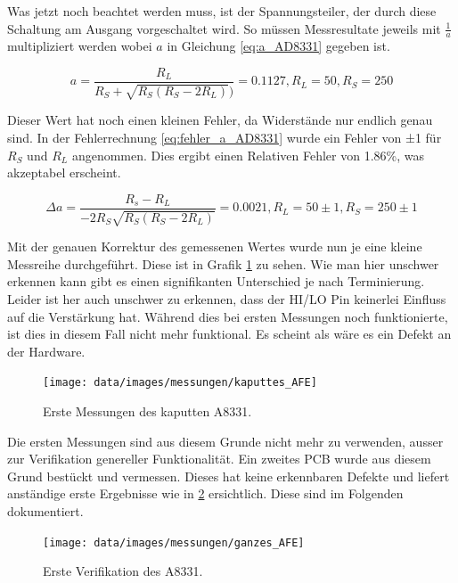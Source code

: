 Was jetzt noch beachtet werden muss, ist der Spannungsteiler, der durch diese Schaltung am Ausgang vorgeschaltet wird.
So müssen Messresultate jeweils mit $\frac{1}{a}$ multipliziert werden wobei $a$ in Gleichung \ref{eq:a_AD8331} gegeben ist.

\begin{equation}
    a = \frac{R_L}{R_S + \sqrt{R_S(R_S - 2R_L)})} = 0.1127, R_L =50, R_S = 250
    \label{eq:a_AD8331}
\end{equation}

Dieser Wert hat noch einen kleinen Fehler, da Widerstände nur endlich genau sind. In der Fehlerrechnung \ref{eq:fehler_a_AD8331} wurde ein Fehler von ±1 für $R_S$ und $R_L$ angenommen. Dies ergibt einen Relativen Fehler von 1.86\%, was akzeptabel erscheint.

\begin{equation}
    \Delta a = \frac{R_s - R_L}{-2R_S\sqrt{R_S(R_S - 2R_L)}} = 0.0021, R_L = 50±1, R_S = 250±1
    \label{eq:fehler_a_AD8331}
\end{equation}

\newpage
Mit der genauen Korrektur des gemessenen Wertes wurde nun je eine kleine Messreihe durchgeführt. Diese ist in Grafik \ref{fig:kaputtes_AFE} zu sehen. Wie man hier unschwer erkennen kann gibt es einen signifikanten Unterschied je nach Terminierung.
Leider ist her auch unschwer zu erkennen, dass der HI/LO Pin keinerlei Einfluss auf die Verstärkung hat. Während dies bei ersten Messungen noch funktionierte, ist dies in diesem Fall nicht mehr funktional. Es scheint als wäre es ein Defekt an der Hardware.

\begin{figure}[H]
\begin{center}
    \texttt{[image: data/images/messungen/kaputtes\_AFE]}
    \caption{Erste Messungen des kaputten A8331.}
    \label{fig:kaputtes_AFE}
\end{center}
\end{figure}

\newpage
Die ersten Messungen sind aus diesem Grunde nicht mehr zu verwenden, ausser zur Verifikation genereller Funktionalität. Ein zweites PCB wurde aus diesem Grund bestückt und vermessen. Dieses hat keine erkennbaren Defekte und liefert anständige erste Ergebnisse wie in \ref{fig:ganzes_AFE} ersichtlich. Diese sind im Folgenden dokumentiert.

\begin{figure}[H]
\begin{center}
    \texttt{[image: data/images/messungen/ganzes\_AFE]}
    \caption{Erste Verifikation des A8331.}
    \label{fig:ganzes_AFE}
\end{center}
\end{figure}

